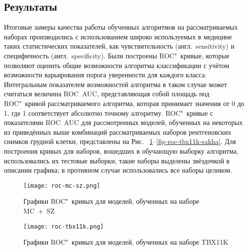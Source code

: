 \subsection{Результаты}

Итоговые замеры качества работы обученных алгоритмов на рассматриваемых наборах производились с использованием широко используемых в медицине таких статистических показателей, как чувствительность (англ.~sensitivity) и специфичность (англ.~specificity). Были построены ROC"~кривые, которые позволяют оценить общие возможности алгоритма классификации с учётом возможности варьирования порога уверенности для каждого класса. Интегральным показателем возможностей алгоритма в таком случае может считаться величина ROC~AUC, представляющая собой площадь под ROC"~кривой рассматриваемого алгоритма, которая принимает значения от 0 до 1, где 1 соответствует абсолютно точному алгоритму. ROC"~кривые с показателями ROC~AUC для рассмотренных моделей, обученных на некоторых из приведённых выше комбинаций рассматриваемых наборов рентгеновских снимков грудной клетки, представлены на Рис.~
\ref{fig-roc-mc-sz}--\ref{fig-roc-tbx11k-sakha}.
Для построения кривых для наборов, вошедших в обучающую выборку алгоритма, использовались их тестовые выборки, такие наборы выделены звёздочкой в описании графика; в противном случае использовались все наборы целиком.

\begin{figure}[ht]%
	\centering
	\texttt{[image: roc-mc-sz.png]}
	\caption{Графики ROC"~кривых для моделей, обученных на наборе MC~+~SZ}\label{fig-roc-mc-sz}
\end{figure}
%
%
\begin{figure}[ht]%
	\centering
	\texttt{[image: roc-tbx11k.png]}
	\caption{Графики ROC"~кривых для моделей, обученных на наборе TBX11K}\label{fig-roc-tbx11k}
\end{figure}


